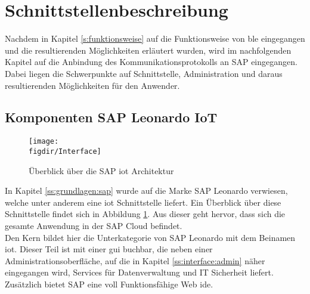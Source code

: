 \section{Schnittstellenbeschreibung}
\label{s:interface} 

\noindent Nachdem in Kapitel \ref{s:funktionsweise} auf die Funktionsweise von \ac{ble} eingegangen und die resultierenden Möglichkeiten erläutert wurden, wird im nachfolgenden Kapitel auf die Anbindung des Kommunikationsprotokolls an SAP eingegangen. Dabei liegen die Schwerpunkte auf Schnittstelle, Administration und daraus resultierenden Möglichkeiten für den Anwender.\\

\subsection{Komponenten SAP Leonardo IoT}
\label{ss:interface:sap}

\begin{figure}[!b]
	\centering
	\texttt{[image: \\figdir/Interface]}
	\caption{Überblick über die SAP \ac{iot} Architektur \cite[Seiten 117, 164, 181, 184, 201, 208, 221]{Holtschulte20:IOS}}
	\label{FIG:Interface}
\end{figure}

In Kapitel \ref{ss:grundlagen:sap} wurde auf die Marke SAP Leonardo verwiesen, welche unter anderem eine \ac{iot} Schnittstelle liefert. Ein Überblick über diese Schnittstelle findet sich in Abbildung \ref{FIG:Interface}. Aus dieser geht hervor, dass sich die gesamte Anwendung in der SAP Cloud befindet.\\

\noindent Den Kern bildet hier die Unterkategorie von SAP Leonardo mit dem Beinamen \ac{iot}. Dieser Teil ist mit einer \ac{gui} buchbar, die neben einer Administrationsoberfläche, auf die in Kapitel \ref{ss:interface:admin} näher eingegangen wird, Services für Datenverwaltung und IT Sicherheit liefert. Zusätzlich bietet SAP eine voll Funktionsfähige Web \ac{ide}.\\

